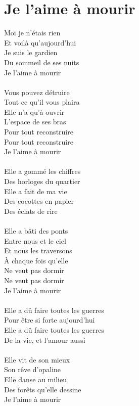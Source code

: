 \section*{Je l'aime à mourir}
Moi je n'étais rien\\
Et voilà qu'aujourd'hui\\
Je suis le gardien\\
Du sommeil de ses nuits\\
Je l'aime à mourir\\\\
Vous pouvez détruire\\
Tout ce qu'il vous plaira\\
Elle n'a qu'à ouvrir\\
L'espace de ses bras\\
Pour tout reconstruire\\
Pour tout reconstruire\\
Je l'aime à mourir\\\\
Elle a gommé les chiffres\\
Des horloges du quartier\\
Elle a fait de ma vie\\
Des cocottes en papier\\
Des éclats de rire\\\\
Elle a bâti des ponts\\
Entre nous et le ciel\\
Et nous les traversons\\
À chaque fois qu'elle\\
Ne veut pas dormir\\
Ne veut pas dormir\\
Je l'aime à mourir\\\\
Elle a dû faire toutes les guerres\\
Pour être si forte aujourd'hui\\
Elle a dû faire toutes les guerres\\
De la vie, et l'amour aussi\\\\
Elle vit de son mieux\\
Son rêve d'opaline\\
Elle danse au milieu\\
Des forêts qu'elle dessine\\
Je l'aime à mourir\\\\
